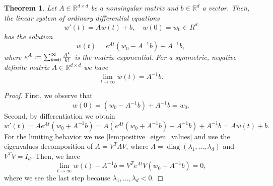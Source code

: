 \documentclass[12pt]{article}
\newtheorem{theorem}{Theorem}[section]
\theoremstyle{definition}
\numberwithin{equation}{section}
\newcommand{\R}{\mathbb{R}}
\newcommand{\defeq}{\vcentcolon=}
\DeclareMathOperator{\diag}{diag}
\begin{document}
\begin{theorem}
  \label{thm:ode_system}
  Let  $A \in \R^{d \times d}$ be a nonsingular matrix and $b \in \R^d$ a vector. Then, the linear system of ordinary differential equations
  \begin{equation*}
    w'(t) = Aw(t) + b, \quad w(0) = w_0 \in R^d
  \end{equation*}
  has the solution
  \begin{equation*}
    w(t) = e^{At}(w_0 - A^{-1}b) + A^{-1}b,
  \end{equation*}
  where $e^A \defeq \sum_{k=0}^\infty \frac{A^k}{k!}$ is the matrix exponential. For a symmetric, negative definite matrix $A \in \R^{d \times d}$ we have
  \begin{equation*}
    \lim_{t \rightarrow \infty} w(t) = A^{-1}b.
  \end{equation*}
\end{theorem}
\begin{proof}
  First, we observe that
  \begin{equation*}
    w(0) = (w_0 - A^{-1}b) + A^{-1}b = w_0.
  \end{equation*}
  Second, by differentiation we obtain
  \begin{equation*}
    w'(t) = A e^{At}(w_0+A^{-1}b) = A (e^{At}(w_0+A^{-1}b) - A^{-1}b) + A^{-1}b = Aw(t) + b.
  \end{equation*}
  For the limiting behavior we use \autoref{lem:positive_eigen_values} and use the eigenvalues decomposition of $A = V^T \Lambda V$, where $\Lambda=\diag(\lambda_1, \dots, \lambda_d)$ and $V^TV = I_d$. Then, we have
  \begin{equation*}
    \lim_{t \rightarrow \infty} w(t) - A^{-1}b = V^Te^{\Lambda t}V(w_0 - A^{-1}b) = 0,
  \end{equation*}
  where we see the last step because $\lambda_1,\dots,\lambda_d < 0$.
\end{proof}
\end{document}
